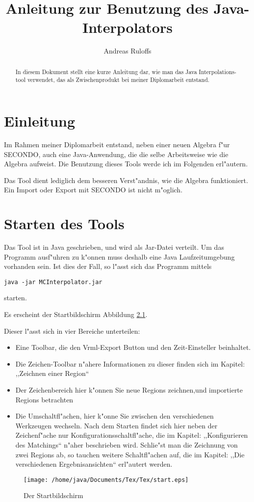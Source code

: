 \documentclass[a4paper,10pt,twoside]{scrreprt}
\title{Anleitung zur Benutzung des Java-Interpolators}
\author{Andreas Ruloffs}
\begin{document}
\maketitle

\begin{abstract}
In diesem Dokument stellt eine kurze Anleitung dar, wie man das Java Interpolations-tool verwendet, das als Zwischenprodukt bei meiner Diplomarbeit entstand.
\end{abstract}
\tableofcontents
\chapter{Einleitung}
Im Rahmen meiner Diplomarbeit entstand, neben einer neuen Algebra f"ur SECONDO, auch eine Java-Anwendung, die die selbe Arbeitsweise wie die Algebra aufweist. Die Benutzung dieses Tools werde ich im Folgenden erl"autern.

Das Tool dient lediglich dem besseren Verst"andnis, wie die Algebra funktioniert. Ein Import oder Export mit SECONDO ist nicht m"oglich.
\chapter{Starten des Tools}
Das Tool ist in Java geschrieben, und wird als Jar-Datei verteilt. Um das Programm ausf"uhren zu k"onnen muss deshalb eine Java Laufzeitumgebung vorhanden sein. Ist dies der Fall, so l"asst sich das Programm mittels \begin{verbatim}
java -jar MCInterpolator.jar
\end{verbatim}  starten.

Es erscheint der Startbildschirm Abbildung \ref{fig:start}.

Dieser l"asst sich in vier Bereiche unterteilen:
\begin{itemize}
\item Eine Toolbar, die den Vrml-Export Button und den Zeit-Einsteller beinhaltet. 
\item Die Zeichen-Toolbar n"ahere Informationen zu dieser finden sich im Kapitel: ,,Zeichnen einer Region``
\item Der Zeichenbereich hier k"onnen Sie neue Regions zeichnen,und importierte Regions betrachten
\item Die Umschaltfl"achen, hier k"onne Sie zwischen den verschiedenen Werkzeugen wechseln. Nach dem Starten findet sich hier neben der Zeichenf"ache nur Konfigurationsschaltfl"ache, die im Kapitel: ,,Konfigurieren des Matchings`` n"aher beschrieben wird. Schlie"st man die Zeichnung von zwei Regions ab, so tauchen weitere Schaltfl"achen auf, die im Kapitel: ,,Die verschiedenen Ergebnisansichten`` erl"autert werden.
\end{itemize} 
\begin{figure}
   \centering
   \texttt{[image: /home/java/Documents/Tex/Tex/start.eps]}
   \caption{Der Startbildschirm}
   \label{fig:start}
\end{figure}
\end{document}
